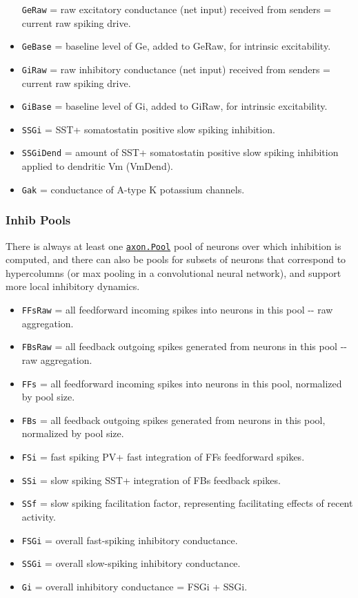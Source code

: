 \documentclass[11pt,twoside]{article}
\newif\myifpdf
\begin{document}
\begin{itemize}
  \texttt{GeRaw} = raw excitatory conductance (net input) received from
  senders = current raw spiking drive.
\item
  \texttt{GeBase} = baseline level of Ge, added to GeRaw, for intrinsic
  excitability.
\item
  \texttt{GiRaw} = raw inhibitory conductance (net input) received from
  senders = current raw spiking drive.
\item
  \texttt{GiBase} = baseline level of Gi, added to GiRaw, for intrinsic
  excitability.
\item
  \texttt{SSGi} = SST+ somatostatin positive slow spiking inhibition.
\item
  \texttt{SSGiDend} = amount of SST+ somatostatin positive slow spiking
  inhibition applied to dendritic Vm (VmDend).
\item
  \texttt{Gak} = conductance of A-type K potassium channels.
\end{itemize}

\hypertarget{inhib-pools}{%
\subsubsection{Inhib Pools}\label{inhib-pools}}

There is always at least one
\href{https://github.com/emer/axon/blob/master/axon/pool.go}{\texttt{axon.Pool}}
pool of neurons over which inhibition is computed, and there can also be
pools for subsets of neurons that correspond to hypercolumns (or max
pooling in a convolutional neural network), and support more local
inhibitory dynamics.

\begin{itemize}
\tightlist
\item
  \texttt{FFsRaw} = all feedforward incoming spikes into neurons in this
  pool -\/- raw aggregation.
\item
  \texttt{FBsRaw} = all feedback outgoing spikes generated from neurons
  in this pool -\/- raw aggregation.
\item
  \texttt{FFs} = all feedforward incoming spikes into neurons in this
  pool, normalized by pool size.
\item
  \texttt{FBs} = all feedback outgoing spikes generated from neurons in
  this pool, normalized by pool size.
\item
  \texttt{FSi} = fast spiking PV+ fast integration of FFs feedforward
  spikes.
\item
  \texttt{SSi} = slow spiking SST+ integration of FBs feedback spikes.
\item
  \texttt{SSf} = slow spiking facilitation factor, representing
  facilitating effects of recent activity.
\item
  \texttt{FSGi} = overall fast-spiking inhibitory conductance.
\item
  \texttt{SSGi} = overall slow-spiking inhibitory conductance.
\item
  \texttt{Gi} = overall inhibitory conductance = FSGi + SSGi.
\end{itemize}
\end{document}
